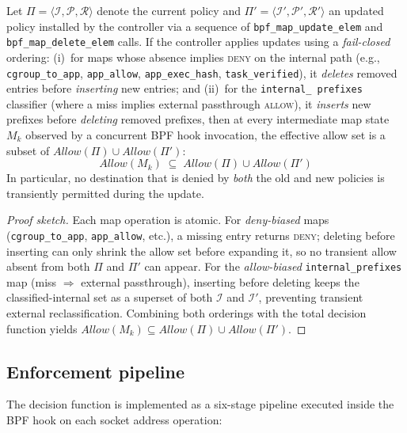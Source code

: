 \documentclass[sigconf]{acmart}
\begin{document}
\begin{theorem}
\label{thm:update-safety}
Let $\Pi = \langle \mathcal{I}, \mathcal{P}, \mathcal{R} \rangle$
denote the current policy and
$\Pi' = \langle \mathcal{I}', \mathcal{P}', \mathcal{R}' \rangle$
an updated policy installed by the controller via a sequence of
\texttt{bpf\_map\_\allowbreak update\_elem} and
\texttt{bpf\_map\_\allowbreak delete\_elem} calls.
If the controller applies updates using a
\emph{fail-closed} ordering: (i)~for maps whose absence
implies \textsc{deny} on the internal path (e.g.,
\texttt{cgroup\_to\_app}, \texttt{app\_allow},
\texttt{app\_exec\_hash}, \texttt{task\_verified}), it
\emph{deletes} removed entries before \emph{inserting} new
entries; and (ii)~for the \texttt{internal\_\allowbreak
prefixes} classifier (where a miss implies external
passthrough \textsc{allow}), it \emph{inserts} new prefixes
before \emph{deleting} removed prefixes, then at every
intermediate map state $M_k$ observed by a concurrent BPF
hook invocation, the effective allow set is a subset of
$\mathit{Allow}(\Pi) \cup \mathit{Allow}(\Pi')$:
\[
  \mathit{Allow}(M_k)
  \;\subseteq\;
  \mathit{Allow}(\Pi) \cup \mathit{Allow}(\Pi')
\]
In particular, no destination that is denied by \emph{both} the
old and new policies is transiently permitted during the update.
\end{theorem}

\begin{proof}[Proof sketch]
Each map operation is atomic.
For \emph{deny-biased} maps (\texttt{cgroup\_to\_app},
\texttt{app\_allow}, etc.), a missing entry returns \textsc{deny}; deleting before inserting
can only shrink the allow set before expanding it, so no transient
allow absent from both $\Pi$ and $\Pi'$ can appear.
For the \emph{allow-biased} \texttt{internal\_prefixes} map (miss
$\Rightarrow$ external passthrough), inserting before deleting keeps
the classified-internal set as a superset of both $\mathcal{I}$ and
$\mathcal{I}'$, preventing transient external reclassification.
Combining both orderings with the total decision function yields
$\mathit{Allow}(M_k) \subseteq \mathit{Allow}(\Pi) \cup
\mathit{Allow}(\Pi')$.
\end{proof}

\subsection{Enforcement pipeline}
\label{sec:enforcement-pipeline}

The decision function is implemented as a six-stage pipeline
executed inside the BPF hook on each socket address operation:
\end{document}
